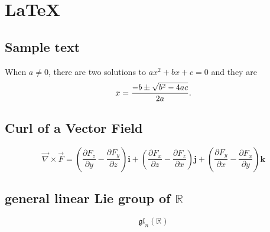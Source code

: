 \documentclass{article}
\begin{document}
\section*{LaTeX}
\subsection*{Sample text}
When \(a \ne 0\), there are two solutions to \(ax^2 + bx + c = 0\) and they are
\[x = {-b \pm \sqrt{b^2-4ac} \over 2a}.\]
\subsection*{Curl of a Vector Field}
\[
	\vec{\nabla} \times \vec{F}
	= \left( \frac{\partial F_z}{\partial y} - \frac{\partial F_y}{\partial z} \right) \mathbf{i}
	+ \left( \frac{\partial F_x}{\partial z} - \frac{\partial F_z}{\partial x} \right) \mathbf{j}
	+ \left( \frac{\partial F_y}{\partial x} - \frac{\partial F_x}{\partial y} \right) \mathbf{k}
\]
\subsection*{general linear Lie group of \(\mathbb{R}\)}
\[\mathfrak{gl}_n(\mathbb{R})\]
\end{document}
